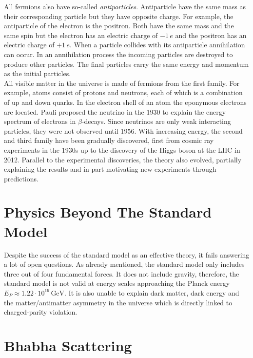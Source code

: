 \documentclass[a4paper,11pt,twosided,final,german,openbib,pdftex,listof=totoc,bibliography=totoc]{scrbook}
\begin{document}
All fermions also have so-called \textit{antiparticles}. Antiparticle have the same mass as their corresponding particle but they have opposite charge. For example, the antiparticle of the electron is the positron. Both have the same mass and the same spin but the electron has an electric charge of $-1\,e$ and the positron has an electric charge of $+1\,e$. When a particle collides with its antiparticle annihilation can occur. In an annihilation process the incoming particles are destroyed to produce other particles. The final particles carry the same energy and momentum as the initial particles.\\


All visible matter in the universe is made of fermions from the first family. For example, atoms consist of protons and neutrons, each of which is a combination of up and down quarks. In the electron shell of an atom the eponymous electrons are located. Pauli proposed the neutrino in the 1930 to explain the energy spectrum of electrons in $\beta$-decays. Since neutrinos are only weak interacting particles, they were not observed until 1956.\cite{REINES19941} With increasing energy, the second and third family have been gradually discovered, first from cosmic ray experiments in the 1930s up to the discovery of the Higgs boson at the LHC in 2012. Parallel to the experimental discoveries, the theory also evolved, partially explaining the results and in part motivating new experiments through predictions.


\section{Physics Beyond The Standard Model}

Despite the success of the standard model as an effective theory, it fails answering a lot of open questions. As already mentioned, the standard model only includes three out of four fundamental forces. It does not include gravity, therefore, the standard model is not valid at energy scales approaching the Planck energy $E_P \approx 1.22\cdot 10^{19}\,\textrm{GeV} $.\cite{sivaram2007special} It is also unable to explain dark matter, dark energy and the matter/antimatter asymmetry in the universe which is directly linked to charged-parity violation.\cite{HAMBYE2012193}

\section{Bhabha Scattering}
\label{sec:Bhabha}
\end{document}
